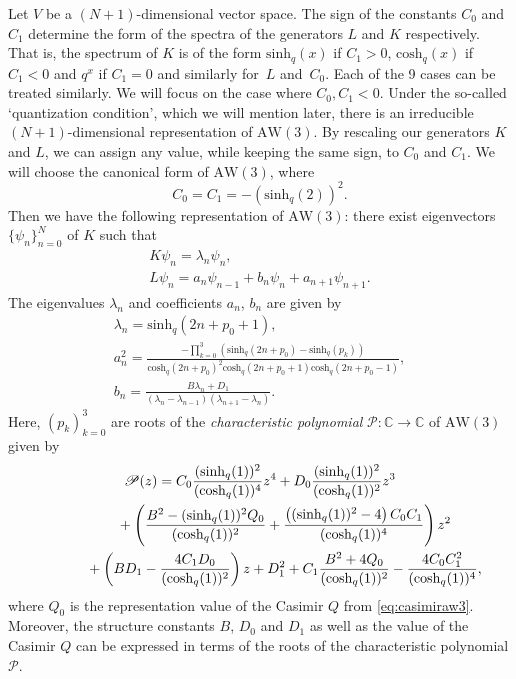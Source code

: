 \documentclass[pdftex]{sigma}
\numberwithin{equation}{section}
\newcommand{\CC}{\mathbb{C}}
\newcommand{\aw}{\mathrm{AW}\!\left(3\right)}
\newcommand{\chq}{\mathrm{cosh}_q}
\newcommand{\shq}{\mathrm{sinh}_q}
\begin{document}
Let $V$ be a $(N+1)$-dimensional vector space. The sign of the constants $C_0$ and $C_1$ determine the form of the spectra of the generators $L$ and $K$ respectively. That is, the spectrum of $K$ is of the form $\shq(x)$ if $C_1>0$, $\chq(x)$ if $C_1 <0$ and $q^x$ if $C_1=0$ and similarly for~$L$ and~$C_0$. Each of the 9 cases can be treated similarly. We will focus on the case where $C_0,C_1 <0$. Under the so-called `quantization condition', which we will mention later, there is an irreducible $(N+1)$-dimensional representation of $\aw$. By rescaling our generators $K$ and $L$, we can assign any value, while keeping the same sign, to $C_0$ and $C_1$. We will choose the canonical form of $\aw$, where
\[
C_0=C_1=-(\shq(2))^2.
\]
Then we have the following representation of $\aw$: there exist eigenvectors $\{\psi_n\}_{n=0}^N$ of $K$ such that
\begin{gather}
	K\psi_n=\lambda_n \psi_n,\label{eq:1vd5}\\
	L\psi_n=a_n\psi_{n-1}+b_n\psi_n + a_{n+1}\psi_{n+1}.\label{eq:anbntri}
\end{gather}
The eigenvalues $\lambda_n$ and coefficients $a_n$, $b_n$ are given by
\begin{gather}
	\lambda_n= \shq(2n+p_0+1),\label{eq:3vd5}\\
	a_n^2=\frac{-\prod_{k=0}^3(\shq(2n+p_0)-\shq(p_k))}{\chq(2n+p_0)^2\chq(2n+p_0+1)\chq(2n+p_0-1)},\label{eq:4vd5}\\
	b_n = \frac{B\lambda_n+D_1}{(\lambda_{n}-\lambda_{n-1})(\lambda_{n+1}-\lambda_n)}\label{eq:5vd5}.
\end{gather}
Here, $(p_k)_{k=0}^3$ are roots of the \textit{characteristic polynomial} $\mathscr{P}\colon \CC\to\CC$ of $\aw$ given by
\begin{gather}
 \mathscr{P}(z)= C_0\frac{(\shq(1))^2}{(\chq(1))^4} z^4 +D_0\frac{(\shq(1))^2}{(\chq(1))^2}z^3\nonumber\\
\hphantom{\mathscr{P}(z)=}{}
+\left(\frac{B^2-(\shq(1))^2Q_0}{(\chq(1))^2}+\frac{\left((\shq(1))^2-4\right)C_0C_1}{(\chq(1))^4}\right)z^2 \nonumber\\
\hphantom{\mathscr{P}(z)=}{}
+\left(BD_1-\frac{4C_1D_0}{(\chq(1))^2}\right)z +D_1^2+C_1\frac{B^2+4Q_0}{(\chq(1))^2}-\frac{4C_0C_1^2}{(\chq(1))^4}, \label{eq:awpol}
\end{gather}
where $Q_0$ is the representation value of the Casimir $Q$ from \eqref{eq:casimiraw3}. Moreover, the structure constants $B$, $D_0$ and $D_1$ as well as the value of the Casimir $Q$ can be expressed in terms of the roots of the characteristic polynomial $\mathscr{P}$.
\end{document}
